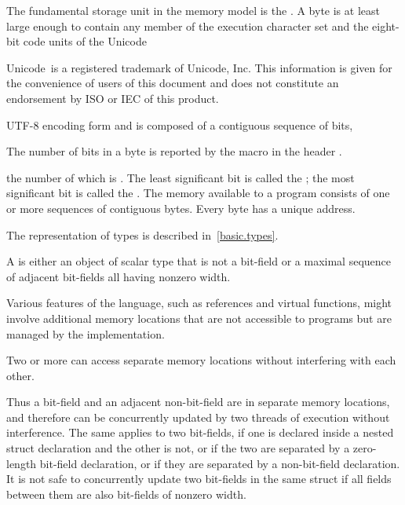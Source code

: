\pnum
{}%
The fundamental storage unit in the \Cpp{} memory model is the
.
A byte is at least large enough to contain any member of the
%
execution character set
and the eight-bit code units of the Unicode
\begin{footnote}
Unicode\textregistered\ is a registered trademark of Unicode, Inc.
This information is given for the convenience of users of this document and
does not constitute an endorsement by ISO or IEC of this product.
\end{footnote}
UTF-8 encoding form
and is composed of a contiguous sequence of
bits,
\begin{footnote}
The number of bits in a byte is reported by the macro
 in the header .
\end{footnote}
the number of which is . The least
significant bit is called the ; the most
significant bit is called the . The memory
available to a \Cpp{} program consists of one or more sequences of
contiguous bytes. Every byte has a unique address.

\pnum
\begin{note}
The representation of types is described
in~\ref{basic.types}.
\end{note}

\pnum
A  is either an object of scalar type that is not a bit-field
or a maximal sequence of adjacent bit-fields all having nonzero width.
\begin{note}
Various
features of the language, such as references and virtual functions, might
involve additional memory locations that are not accessible to programs but are
managed by the implementation.
\end{note}
Two or more  can access separate memory
locations without interfering with each other.

\pnum
\begin{note}
Thus a bit-field and an adjacent non-bit-field are in separate memory
locations, and therefore can be concurrently updated by two threads of execution
without interference. The same applies to two bit-fields, if one is declared
inside a nested struct declaration and the other is not, or if the two are
separated by a zero-length bit-field declaration, or if they are separated by a
non-bit-field declaration. It is not safe to concurrently update two bit-fields
in the same struct if all fields between them are also bit-fields of nonzero
width.
\end{note}

